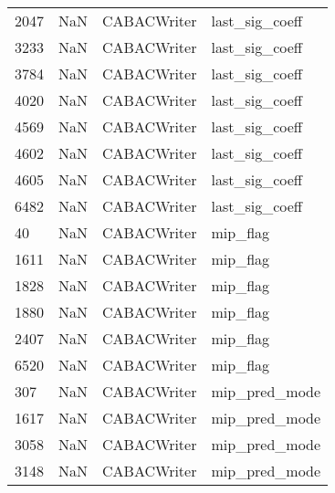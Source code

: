 \begin{tabular}{llll}
2047 &                   NaN &                CABACWriter &                            last\_sig\_coeff \\
3233 &                   NaN &                CABACWriter &                            last\_sig\_coeff \\
3784 &                   NaN &                CABACWriter &                            last\_sig\_coeff \\
4020 &                   NaN &                CABACWriter &                            last\_sig\_coeff \\
4569 &                   NaN &                CABACWriter &                            last\_sig\_coeff \\
4602 &                   NaN &                CABACWriter &                            last\_sig\_coeff \\
4605 &                   NaN &                CABACWriter &                            last\_sig\_coeff \\
6482 &                   NaN &                CABACWriter &                            last\_sig\_coeff \\
40   &                   NaN &                CABACWriter &                                  mip\_flag \\
1611 &                   NaN &                CABACWriter &                                  mip\_flag \\
1828 &                   NaN &                CABACWriter &                                  mip\_flag \\
1880 &                   NaN &                CABACWriter &                                  mip\_flag \\
2407 &                   NaN &                CABACWriter &                                  mip\_flag \\
6520 &                   NaN &                CABACWriter &                                  mip\_flag \\
307  &                   NaN &                CABACWriter &                             mip\_pred\_mode \\
1617 &                   NaN &                CABACWriter &                             mip\_pred\_mode \\
3058 &                   NaN &                CABACWriter &                             mip\_pred\_mode \\
3148 &                   NaN &                CABACWriter &                             mip\_pred\_mode \\

\end{tabular}
